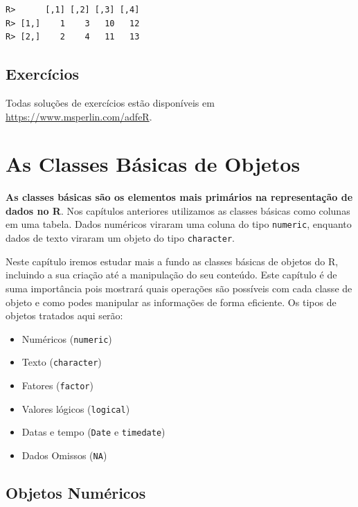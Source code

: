 \documentclass[
  11pt,
]{book}
\providecommand{\tightlist}{%
  \setlength{\itemsep}{0pt}\setlength{\parskip}{0pt}}
\begin{document}
\begin{verbatim}
R>      [,1] [,2] [,3] [,4]
R> [1,]    1    3   10   12
R> [2,]    2    4   11   13
\end{verbatim}

\hypertarget{exerc-classe-estrutura}{%
\section{Exercícios}\label{exerc-classe-estrutura}}

Todas soluções de exercícios estão disponíveis em \url{https://www.msperlin.com/adfeR}.

\hypertarget{classes-basicas}{%
\chapter{As Classes Básicas de Objetos}\label{classes-basicas}}

\textbf{As classes básicas são os elementos mais primários na representação de dados no R}. Nos capítulos anteriores utilizamos as classes básicas como colunas em uma tabela. Dados numéricos viraram uma coluna do tipo \texttt{numeric}, enquanto dados de texto viraram um objeto do tipo \texttt{character}.

Neste capítulo iremos estudar mais a fundo as classes básicas de objetos do R, incluindo a sua criação até a manipulação do seu conteúdo. Este capítulo é de suma importância pois mostrará quais operações são possíveis com cada classe de objeto e como podes manipular as informações de forma eficiente. Os tipos de objetos tratados aqui serão:

\begin{itemize}
\tightlist
\item
  Numéricos (\texttt{numeric})
\item
  Texto (\texttt{character})
\item
  Fatores (\texttt{factor})
\item
  Valores lógicos (\texttt{logical})
\item
  Datas e tempo (\texttt{Date} e \texttt{timedate})
\item
  Dados Omissos (\texttt{NA})
\end{itemize}

\hypertarget{objetos-numuxe9ricos}{%
\section{Objetos Numéricos}\label{objetos-numuxe9ricos}}
\end{document}
